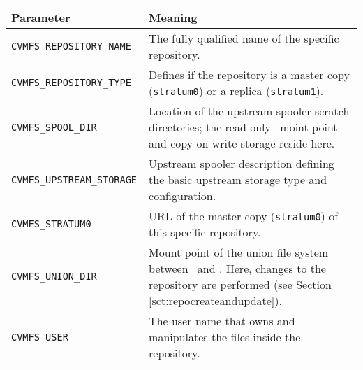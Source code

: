 	\begin{longtable}{lX}
		\toprule
		{\bf\centering Parameter} 			& {\bf\centering Meaning}\\
		\midrule
		\tt CVMFS\_REPOSITORY\_NAME			& The fully qualified name of the specific repository.\\
		\tt CVMFS\_REPOSITORY\_TYPE			& Defines if the repository is a master copy (\texttt{stratum0}) or a replica (\texttt{stratum1}).\\
		\tt CVMFS\_SPOOL\_DIR					& Location of the upstream spooler scratch directories; the read-only \cvmfs\ moint point and copy-on-write storage reside here.\\
		\tt CVMFS\_UPSTREAM\_STORAGE			& Upstream spooler description defining the basic upstream storage type and configuration.\\
		\tt CVMFS\_STRATUM0					& URL of the master copy (\texttt{stratum0}) of this specific repository.\\
		\tt CVMFS\_UNION\_DIR					& Mount point of the union file system between \cvmfs\ and \aufs. Here, changes to the repository are performed (see Section \ref{sct:repocreateandupdate}).\\
		\tt CVMFS\_USER							& The user name that owns and manipulates the files inside the repository.\\
		\bottomrule
	\end{longtable}

